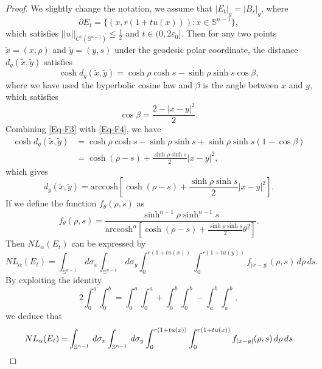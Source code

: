 \documentclass[11pt,reqno]{amsart}
\theoremstyle{definition}
\theoremstyle{remark}
\numberwithin{equation}{section}
\renewcommand{\(}{\left(}
\renewcommand{\)}{\right)}
\renewcommand{\-}{\overline}
\begin{document}
\begin{proof}
	We slightly change the notation, we assume that $|E_t|_g=|B_r|_g$, where 
	\begin{equation*}
		\partial E_t=\{(x,r(1+tu(x))):x\in\mathbb{S}^{n-1}\},
\end{equation*}
which satisfies $||u||_{C^1(\mathbb{S}^{n-1})}\leq\frac{1}{2}$ and $t\in(0,2\varepsilon_0]$. Then for any two points $\tilde{x}=(x,\rho)$ and $\tilde{y}=(y,s)$ under the geodesic polar coordinate, the distance $d_g(\tilde{x},\tilde{y})$ satisfies
\begin{equation}\label{Eq-F3}
	\cosh d_g(\tilde{x},\tilde{y})=\cosh\rho\cosh s-\sinh\rho\sinh s\cos\beta,
\end{equation}
where we have used the hyperbolic cosine law and $\beta$ is the angle between $x$ and $y$,
which satisfies
\begin{equation}\label{Eq-F4}
	\cos\beta=\frac{2-|x-y|^2}{2}.
\end{equation}
Combining \eqref{Eq-F3} with \eqref{Eq-F4}, we have
\begin{align*}
	\cosh d_g(\tilde{x},\tilde{y})&=\cosh\rho\cosh s-\sinh\rho\sinh s+\sinh\rho\sinh s(1-\cos\beta)\\
	&=\cosh(\rho-s)+\frac{\sinh\rho\sinh s}{2}|x-y|^2,
\end{align*} 
which gives
\begin{equation*}
	d_g(\tilde{x},\tilde{y})=\mathrm{arccosh}\left[\cosh(\rho-s)+\frac{\sinh\rho\sinh s}{2}|x-y|^2\right].
\end{equation*}
If we define the function $f_{\theta}(\rho,s)$ as
\begin{equation}\label{Eq-F5}
	f_{\theta}(\rho,s)=\frac{\sinh^{n-1}\rho\sinh^{n-1}s}{\mathrm{arccosh}^{\alpha}\left[\cosh(\rho-s)+\frac{\sinh\rho\sinh s}{2}{\theta}^2\right]}.
\end{equation}
Then $NL_{\alpha}(E_t)$ can be expressed by 
\begin{equation}\label{Eq-F6}
	NL_{\alpha}(E_t)=\int_{\mathbb{S}^{n-1}}\,d\sigma_x\int_{\mathbb{S}^{n-1}}\,d\sigma_y\int_0^{r(1+tu(x))}\int_0^{r(1+tu(y))}{f_{|x-y|}(\rho,s)}\,d\rho\,ds.
\end{equation}
By exploiting the identity
\begin{equation*}
	2\int_0^a\int_0^b=\int_0^a\int_0^a+\int_0^b\int_0^b-\int_a^b\int_a^b,
\end{equation*}
we deduce that 
\begin{align}
	NL_{\alpha}(E_t)=&\int_{\mathbb{S}^{n-1}}\,d\sigma_x\int_{\mathbb{S}^{n-1}}\,d\sigma_y\int_0^{r(1+tu(x))}\int_0^{r(1+tu(x))}{f_{|x-y|}(\rho,s)}\,d\rho\,ds\notag\\

\end{align}
\end{proof}
\end{document}
